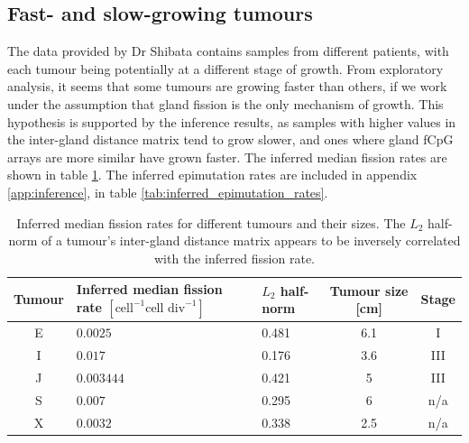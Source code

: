 \subsection{Fast- and slow-growing tumours}
The data provided by Dr Shibata contains samples from different patients, with
each tumour being potentially at a different stage of growth. From exploratory
analysis, it seems that some tumours are growing faster than others, if we work
under the assumption that gland fission is the only mechanism of growth. This
hypothesis is supported by the inference results, as samples with higher values
in the inter-gland distance matrix tend to grow slower, and ones where gland
fCpG arrays are more similar have grown faster. The inferred median fission
rates are shown in table \ref{tab:fission_rates}. The inferred epimutation
rates are included in appendix \ref{app:inference}, in table
\ref{tab:inferred_epimutation_rates}.

\begin{table}[ht]
    \centering
    \begin{tabularx}{\textwidth}{|c|X|X|c|c|}
    \hline
    Tumour & Inferred median fission rate $[\text{cell}^{-1}\text{cell div}^{-1}]$ & $L_2$ half-norm & Tumour size [cm] & Stage \\
    \hline
    E & $0.0025$ & 0.481 & 6.1 & I \\
    \hline
    I & $0.017$ & 0.176 & 3.6 & III \\
    \hline
    J & $0.003444$ & 0.421 & 5 & III \\
    \hline
    S & $0.007$ & 0.295 & 6 & n/a \\
    \hline
    X & $0.0032$ & 0.338 & 2.5 & n/a \\
    \hline
    \end{tabularx}
    \caption{Inferred median fission rates for different tumours and their
    sizes. The $L_2$ half-norm of a tumour's inter-gland distance matrix appears
    to be inversely correlated with the inferred fission rate.}
    \label{tab:fission_rates}
\end{table}

